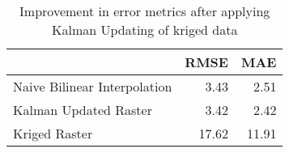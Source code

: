 \begin{table}
\centering
\caption{Improvement in error metrics after applying Kalman Updating of kriged data}
\label{tab:oahu5_gebco_raster_error}
\begin{tabular}{lrr}
\toprule
 & RMSE & MAE \\
\midrule
Naive Bilinear Interpolation & 3.43 & 2.51 \\
Kalman Updated Raster & 3.42 & 2.42 \\
Kriged Raster & 17.62 & 11.91 \\
\bottomrule
\end{tabular}
\end{table}
